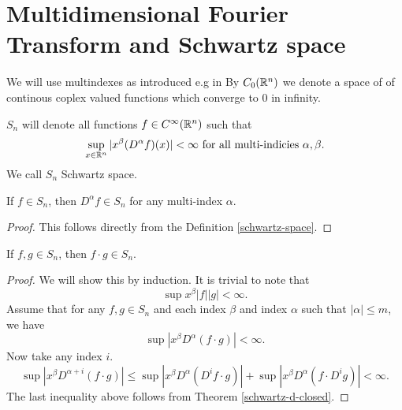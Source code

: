 \documentclass[main.tex]{subfiles}
\begin{document}
\section{Multidimensional Fourier Transform and Schwartz space}
We will use multindexes as introduced e.g in \cite[V.3]{reed-simon1980} By $C_0(\mathbb{R}^n)$ we denote a space of of continous coplex valued functions which converge to $0$ in infinity.
\begin{definition}
\label{schwartz-space}
$S_n$ will denote all functions $f\in C^\infty(\mathbb{R}^n)$ such that
\begin{equation}
\label{schwartz-space-condition}
\sup_{x\in\mathbb{R}^n}|x^\beta (D^\alpha f)(x)| < \infty \text{ for all multi-indicies } \alpha, \beta.
\end{equation}
We call $S_n$ Schwartz space. 
\end{definition}
\begin{theorem}
If $f\in S_n$, then $D^\alpha f\in S_n$ for any multi-index $\alpha$.
\end{theorem}
\begin{proof}
This follows directly from the Definition \ref{schwartz-space}.
\end{proof}
\begin{theorem}
\label{schwartz-d-closed}
If $f,g \in S_n$, then $f\cdot g\in S_n$.
\end{theorem}
\begin{proof}
We will show this by induction. It is trivial to note that 
\begin{equation}
\sup x^\beta|f||g| < \infty.
\end{equation}
Assume that for any $f,g\in S_n$ and each index $\beta$ and index $\alpha$ such that $|\alpha | \leq m$, we have
\begin{equation}
\sup|x^\beta D^\alpha(f\cdot g)| < \infty.
\end{equation}
Now take any index $i$.
\begin{equation}
\sup|x^\beta D^{\alpha + i}(f\cdot g)| \leq \sup|x^\beta D^\alpha(D^i f\cdot g)| + \sup|x^\beta D^\alpha(f \cdot D^i g)| < \infty.
\end{equation}
The last inequality above follows from Theorem \ref{schwartz-d-closed}.
\end{proof}
\end{document}
